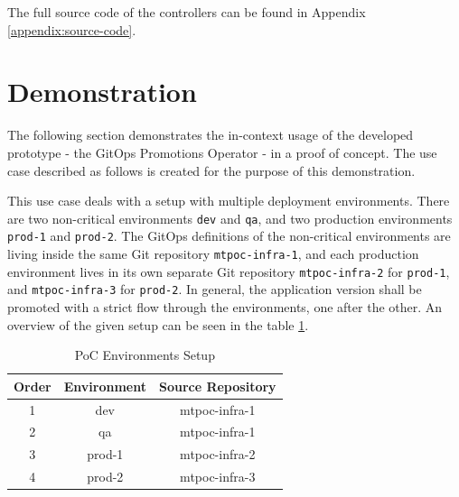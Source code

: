 The full source code of the controllers can be found in Appendix
\ref{appendix:source-code}.















\section{Demonstration}
\label{prototype:demonstration}

The following section demonstrates the in-context usage of the
developed prototype - the GitOps Promotions Operator - in a proof of concept.
The use case described as follows is created for the purpose of this demonstration.

This use case deals with a setup with multiple deployment environments.
There are two non-critical environments \lstinline|dev| and \lstinline|qa|,
and two production environments \lstinline|prod-1| and \lstinline|prod-2|.
The GitOps definitions of the non-critical environments are living inside the same
Git repository \lstinline|mtpoc-infra-1|,
and each production environment lives in its own separate Git repository
\lstinline|mtpoc-infra-2| for \lstinline|prod-1|,
and \lstinline|mtpoc-infra-3| for \lstinline|prod-2|.
In general, the application version shall be promoted with a strict flow
through the environments, one after the other.
An overview of the given setup can be seen in the table \ref{table:poc-environments-setup}.

\begin{table}[h]
\begin{center}
	\begin{tabular}{||c c c||} 
		\hline
		Order & Environment & Source Repository \\ [0.5ex] 
		\hline\hline
		1 & dev & mtpoc-infra-1 \\ 
		\hline
		2 & qa & mtpoc-infra-1 \\
		\hline
		3 & prod-1 & mtpoc-infra-2 \\
		\hline
		4 & prod-2 & mtpoc-infra-3 \\
		\hline
	\end{tabular}
	\caption{PoC Environments Setup}
	\label{table:poc-environments-setup}
\end{center}
\end{table}

